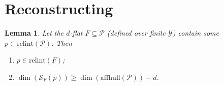 \documentclass[11pt]{article} %
\newcommand{\Comments}{1}
\newcommand{\mytodo}[2]{\ifnum\Comments=1%
	\todo[linecolor=#1!80!black,backgroundcolor=#1,bordercolor=#1!80!black]{#2}\fi}
\newcommand{\raft}[1]{\mytodo{green!20!white}{RF: #1}}
\newcommand{\jessiet}[1]{\mytodo{purple!20!white}{JF: #1}}
\newcommand{\relint}[1]{\mathrm{relint}(#1)}
\newcommand{\spn}{\mathrm{span}}
\newcommand{\affhull}{\mathrm{affhull}}
\renewcommand{\P}{\mathcal{P}}
\newcommand{\Scr}{\mathcal{S}}  %
\newcommand{\Y}{\mathcal{Y}}
\newtheorem{lemma}{Lemma}
\begin{document}
\section{Reconstructing \citet[Thm.\ 16]{ramaswamy2016convex}}



\begin{lemma}\label{lem:finite-relint-dim}
  Let the $d$-flat $F\subseteq \P$ (defined over finite $\Y$) contain some $p\in\relint{\P}$.
  Then 
  \begin{enumerate}
  	\item[(i)] $p \in \relint{F}$; 
  	\item[(ii)] $\dim(\Scr_F(p)) \geq \dim(\affhull(\P)) - d$.
  \end{enumerate}
\end{lemma}
\end{document}
